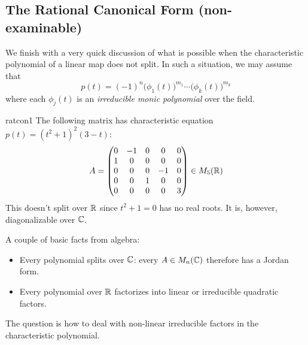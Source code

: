 


\clearpage


 
\subsection{The Rational Canonical Form (non-examinable)}

We finish with a very quick discussion of what is possible when the characteristic polynomial of a linear map does not split. In such a situation, we may assume that
\[
	p(t)=(-1)^n\bigl(\phi_1(t)\bigr)^{m_1}\cdots\bigl(\phi_k(t)\bigr)^{m_k}\tag{$\ast$}
\]
where each $\phi_j(t)$ is an \emph{irreducible monic polynomial} over the field.

\begin{example}{}{ratcon1}
	The following matrix has characteristic equation $p(t)=(t^2+1)^2(3-t)$:
	\[
		A=
		\begin{pmatrix}
			0 & -1 & 0 & 0 & 0\\
			1 & 0 & 0 & 0 & 0\\
			0 & 0 & 0 & -1 & 0\\
			0 & 0 & 1 & 0 & 0\\
			0 & 0 & 0 & 0 & 3
		\end{pmatrix}
		\in M_5(\mathbb{R})
	\]
	This doesn't split over $\mathbb{R}$ since $t^2+1=0$ has no real roots. It is, however, diagonalizable over $\mathbb{C}$.
\end{example}

A couple of basic facts from algebra:
\begin{itemize}
  \item Every polynomial splits over $\mathbb{C}$: every $A\in M_n(\mathbb{C})$ therefore has a Jordan form.
  \item Every polynomial over $\mathbb{R}$ factorizes into linear or irreducible quadratic factors.
\end{itemize}

The question is how to deal with non-linear irreducible factors in the characteristic polynomial.

